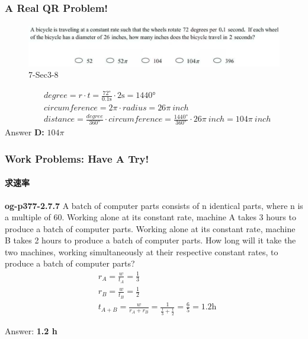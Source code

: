 \documentclass[
	11pt, %
]{beamer}
\begin{document}

\begin{frame}
	\frametitle{A Real QR Problem!}
	\framesubtitle{}
	\begin{figure}
		\includegraphics[width=\linewidth]{Rate_Example_Question1.png}
		\caption{7-Sec3-8}
	\end{figure}
	\pause
	\begin{equation*}
	  \begin{aligned}
	  		&degree =  r \cdot t = \frac{\ang{72}}{0.1 \unit{\second}} \cdot 2 \unit{\second} = \ang{1440}\\
		    &circumference = 2 \pi \cdot radius  = 26 \pi \ \unit{inch}\\
		    & distance = \frac{degree}{\ang{360}} \cdot circumference = \frac{\ang{1440}}{\ang{360}} \cdot 26 \pi \ \unit{inch}= 104 \pi \ \unit{inch}
	  \end{aligned}
	\end{equation*}
	\pause
	\bigskip
	Answer \textbf{D: } $104\pi$
\end{frame}


\begin{frame}
	\frametitle{Work Problems: Have A Try!}
	\framesubtitle{求速率}
	\textbf{og-p377-2.7.7}
	A batch of computer parts consists of n identical parts,
where n is a multiple of 60. Working alone at its constant rate, machine A
takes 3 hours to produce a batch of computer parts. Working alone at its
constant rate, machine B takes 2 hours to produce a batch of computer
parts. How long will it take the two machines, working simultaneously at
their respective constant rates, to produce a batch of computer parts?\\
	\pause
	\bigskip
	\begin{equation*}
	  \begin{aligned}
	  		&r_A = \frac{w}{t_A}= \frac{1}{3} \\
	  		&r_B = \frac{w}{t_B}= \frac{1}{2} \\
		    &t_{A+B} = \frac{w}{r_A + r_B} = \frac{1}{\frac{1}{3}  + \frac{1}{2}} = \frac{6}{5} = 1.2 \unit{\hour}
	  \end{aligned}
	\end{equation*}


	\pause
	\bigskip
	Answer: \textbf{1.2 \unit{\hour}}
\end{frame}
\end{document}
